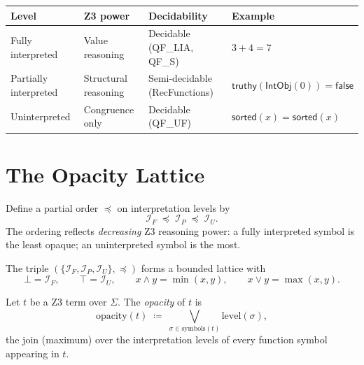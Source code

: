 \begin{center}
\begin{tabular}{l l l l}
  \toprule
  \textbf{Level} & \textbf{Z3 power} & \textbf{Decidability}
    & \textbf{Example} \\
  \midrule
  Fully interpreted
    & Value reasoning
    & Decidable (QF\_LIA, QF\_S)
    & $3 + 4 = 7$ \\
  Partially interpreted
    & Structural reasoning
    & Semi-decidable (RecFunctions)
    & $\mathsf{truthy}(\mathsf{IntObj}(0)) = \mathsf{false}$ \\
  Uninterpreted
    & Congruence only
    & Decidable (QF\_UF)
    & $\mathsf{sorted}(x) = \mathsf{sorted}(x)$ \\
  \bottomrule
\end{tabular}
\end{center}


\section{The Opacity Lattice}
\label{sec:opacity-lattice}

\begin{definition}
\label{def:opacity-order}
Define a partial order $\preceq$ on interpretation levels by
\[
  \mathcal{I}_F \;\preceq\; \mathcal{I}_P \;\preceq\; \mathcal{I}_U.
\]
The ordering reflects \emph{decreasing} Z3 reasoning power: a fully
interpreted symbol is the least opaque; an uninterpreted symbol is
the most.
\end{definition}

\begin{proposition}
\label{prop:opacity-lattice}
The triple $(\{\mathcal{I}_F, \mathcal{I}_P, \mathcal{I}_U\},
\preceq)$ forms a bounded lattice with
\[
  \bot = \mathcal{I}_F, \qquad
  \top = \mathcal{I}_U, \qquad
  x \wedge y = \min(x,y), \qquad
  x \vee y = \max(x,y).
\]
\end{proposition}

\begin{definition}
\label{def:term-opacity}
Let $t$ be a Z3 term over $\Sigma$.  The \emph{opacity} of $t$ is
\[
  \mathrm{opacity}(t) \;\coloneqq\;
  \bigvee_{\sigma \in \mathrm{symbols}(t)} \mathrm{level}(\sigma),
\]
the join (maximum) over the interpretation levels of every function
symbol appearing in $t$.
\end{definition}

